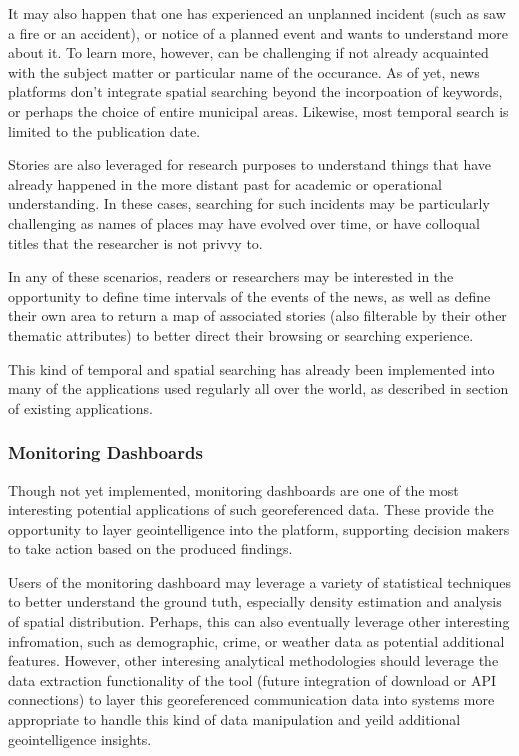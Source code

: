 It may also happen that one has experienced an unplanned incident (such as saw a fire or an accident), or notice of a planned event and wants to understand more about it. To learn more, however, can be challenging if not already acquainted with the subject matter or particular name of the occurance. As of yet, news platforms don't integrate spatial searching beyond the incorpoation of keywords, or perhaps the choice of entire municipal areas.  Likewise, most temporal search is limited to the publication date.

Stories are also leveraged for research purposes to understand things that have already happened in the more distant past for academic or operational understanding. In these cases, searching for such incidents may be particularly challenging as names of places may have evolved over time, or have colloqual titles that the researcher is not privvy to.

In any of these scenarios, readers or researchers may be interested in the opportunity to define time intervals of the events of the news, as well as define their own area to return a map of associated stories (also filterable by their other thematic attributes) to better direct their browsing or searching experience.

This kind of temporal and spatial searching has already been implemented into many of the applications used regularly all over the world, as described in {\color{red}section of existing applications}. 

\subsubsection{Monitoring Dashboards}
Though not yet implemented, monitoring dashboards are one of the most interesting potential applications of such georeferenced data. These provide the opportunity to layer geointelligence into the platform, supporting decision makers to take action based on the produced findings.

Users of the monitoring dashboard may leverage a variety of statistical techniques to better understand the ground tuth, especially density estimation and analysis of spatial distribution. Perhaps, this can also eventually leverage other interesting infromation, such as demographic, crime, or weather data as potential additional features. However, other interesing analytical methodologies should leverage the data extraction functionality of the tool (future integration of download or API connections) to layer this georeferenced communication data into systems more appropriate to handle this kind of data manipulation and yeild additional geointelligence insights.

